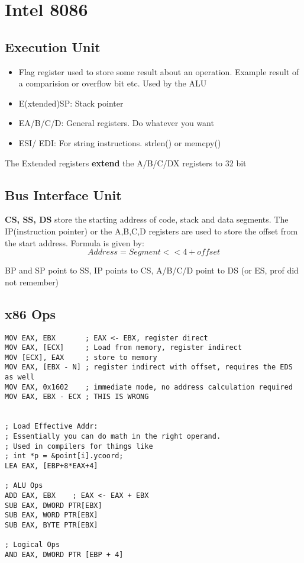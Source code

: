 \documentclass[11pt,letterpaper]{article}
\begin{document}
\maketitle
\thispagestyle{first}
\section*{Intel 8086}
\subsection*{Execution Unit}
\begin{itemize}
	\item Flag register used to store some result about an operation. Example
		result of a comparision or overflow bit etc. Used by the ALU
	\item E(xtended)SP: Stack pointer
	\item EA/B/C/D: General registers. Do whatever you want
	\item ESI/ EDI: For string instructions. strlen() or memcpy()
\end{itemize}

The Extended registers \textbf{extend} the A/B/C/DX registers to 32 bit

\subsection*{Bus Interface Unit}
\textbf{CS, SS, DS} store the starting address of code, stack and data segments.
The IP(instruction pointer) or the {A,B,C,D} registers are used to store the offset from the start address.
Formula is given by:  \[Address = Segment << 4 + offset\]

BP and SP point to SS, IP points to CS, A/B/C/D point to DS (or ES, prof did not remember)


\subsection*{x86 Ops}
\begin{verbatim}
MOV EAX, EBX       ; EAX <- EBX, register direct
MOV EAX, [ECX]     ; Load from memory, register indirect
MOV [ECX], EAX     ; store to memory
MOV EAX, [EBX - N] ; register indirect with offset, requires the EDS as well
MOV EAX, 0x1602    ; immediate mode, no address calculation required
MOV EAX, EBX - ECX ; THIS IS WRONG


; Load Effective Addr:
; Essentially you can do math in the right operand.
; Used in compilers for things like
; int *p = &point[i].ycoord;
LEA EAX, [EBP+8*EAX+4]

; ALU Ops
ADD EAX, EBX	; EAX <- EAX + EBX
SUB EAX, DWORD PTR[EBX]
SUB EAX, WORD PTR[EBX]
SUB EAX, BYTE PTR[EBX]

; Logical Ops
AND EAX, DWORD PTR [EBP + 4]
\end{verbatim}
\end{document}
